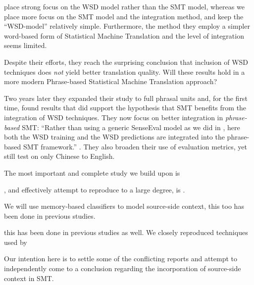 \documentclass[11pt]{article}
\begin{document}
\cite{CarpuatWu05} place strong focus on the WSD model rather than the SMT model,
whereas we place more focus on the SMT model and the integration method, and
keep the ``WSD-model'' relatively simple. Furthermore, the method they employ a simpler word-based form of Statistical Machine Translation and the level of integration seems limited.

Despite their efforts, they reach the surprising conclusion that inclusion of
WSD techniques does \emph{not} yield better translation quality. Will these
results hold in a more modern Phrase-based Statistical Machine Translation
approach?

Two years later they expanded their study to full phrasal units
\citep{CarpuatWu07} and, for the first time, found results that did support the
hypothesis that SMT benefits from the integration of WSD techniques. They now focus on better integration in \emph{phrase-based} SMT: ``Rather than using a generic SenseEval model as we did in \cite{CarpuatWu05}, here both the WSD training and the WSD predictions are integrated into the phrase-based SMT framework.'' \citep{CarpuatWu07}. They also broaden their use of evaluation metrics, yet still test on only Chinese to English.

The most important and complete study we build upon is \cite{}

, and effectively attempt to reproduce to a large degree, is \cite{}.



We will use memory-based classifiers to model source-side context, this too has been done in previous studies.

this has been done in previous studies as well. We closely reproduced techniques used by 







Our intention here is to settle some of the conflicting reports and attempt to independently come to a conclusion regarding the incorporation of source-side context in SMT.
\end{document}
